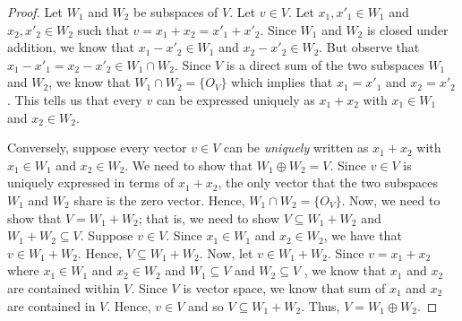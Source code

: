 \begin{proof}

Let \( W_{1}  \) and \( W_{2}  \) be subspaces of \( V  \). Let \( v \in V  \).  Let \( x_{1}, x'_{1} \in W_{1}  \) and \( x_{2}, x'_{2} \in W_{2}  \) such that \( v = x_{1} + x_{2} = x'_{1} + x'_{2}  \). Since \( W_{1}  \) and \( W_{2}  \) is closed under addition, we know that \( x_{1} - x'_{2} \in W_{1}  \) and \( x_{2} - x'_{2} \in W_{2}  \). But observe that \( x_{1} - x'_{1} = x_{2} - x'_{2} \in W_{1} \cap W_{2}  \). Since \( V  \) is a direct sum of the two subspaces \( W_{1}  \) and \( W_{2}  \), we know that \( W_{1} \cap W_{2} = \{ O_{V} \}  \) which implies that \( x_{1} = x'_{1} \) and \( x_{2} = x'_{2} \). This tells us that every \( v  \) can be expressed uniquely as \( x_{1} + x_{2}   \) with \( x_{1} \in W_{1}  \) and \( x_{2} \in W_{2} \).

Conversely, suppose every vector \( v \in V  \) can be \textit{uniquely} written as \( x_{1} + x_{2}  \) with \( x_{1} \in W_{1}  \) and \( x_{2} \in W_{2} \). We need to show that \( W_{1} \oplus W_{2} = V \). Since \( v \in V  \) is uniquely expressed in terms of \( x_{1} + x_{2}  \), the only vector that the two subspaces \( W_{1}  \) and \( W_{2}  \) share is the zero vector. Hence, \( W_{1} \cap W_{2} = \{ O_{V} \}  \). Now, we need to show that \( V = W_{1} + W_{2} \); that is, we need to show \( V \subseteq W_{1} + W_{2}  \) and \( W_{1} + W_{2} \subseteq V  \). Suppose \( v \in V  \). Since \( x_{1} \in W_{1}  \) and \( x_{2} \in W_{2} \), we have that \( v \in W_{1} + W_{2} \). Hence, \( V \subseteq W_{1} + W_{2} \).  Now, let \( v \in W_{1} + W_{2}  \). Since \( v = x_{1} + x_{2}  \) where \( x_{1} \in W_{1}  \) and \( x_{2} \in W_{2}  \) and \( W_{1} \subseteq V  \) and \( W_{2} \subseteq V  \) , we know that \( x_{1} \) and \(x_{2} \) are contained within \( V  \). Since \( V  \) is vector space, we know that sum of  \( x_{1} \) and \( x_{2}  \) are contained in \( V  \). Hence, \( v \in V  \) and so \( V \subseteq W_{1} + W_{2} \). Thus, \( V = W_{1} \oplus W_{2} \).
\end{proof}



